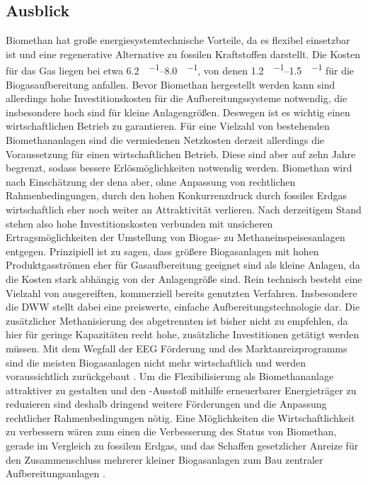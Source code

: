 \subsection{Ausblick}

Biomethan hat große energiesystemtechnische Vorteile, da es flexibel einsetzbar ist und eine regenerative Alternative zu fossilen Kraftstoffen darstellt. Die Kosten für das Gas liegen bei etwa \SIrange{6,2}{8,0}{\ct\per\kwh}, von denen \SIrange{1,2}{1,5}{\ct\per\kwh} für die Biogasaufbereitung anfallen. Bevor Biomethan hergestellt werden kann sind allerdings hohe Investitionskosten für die Aufbereitungssysteme notwendig, die insbesondere hoch sind für kleine Anlagengrößen. Deswegen ist es wichtig einen wirtschaftlichen Betrieb zu garantieren. Für eine Vielzahl von bestehenden Biomethananlagen sind die vermiedenen Netzkosten derzeit allerdings die Voraussetzung für einen wirtschaftlichen Betrieb. Diese sind aber auf zehn Jahre begrenzt, sodass bessere Erlösmöglichkeiten notwendig werden. Biomethan wird nach Einschätzung der dena aber, ohne Anpassung von rechtlichen Rahmenbedingungen, durch den hohen Konkurrenzdruck durch fossiles Erdgas wirtschaftlich eher noch weiter an Attraktivität verlieren.  \parencite{dena2018} \newline
Nach derzeitigem Stand stehen also hohe Investitionskosten verbunden mit unsicheren Ertragsmöglichkeiten der Umstellung von Biogas- zu Methaneinspeisesanlagen entgegen. Prinzipiell ist zu sagen, dass größere Biogasanlagen mit hohen Produktgasströmen eher für Gasaufbereitung geeignet sind als kleine Anlagen, da die Kosten stark abhängig von der Anlagengröße sind. Rein technisch besteht eine Vielzahl von ausgereiften, kommerziell bereits genutzten Verfahren. Insbesondere die \gls{DWW} stellt dabei eine preiswerte, einfache Aufbereitungstechnologie dar. Die zusätzlicher Methanisierung des abgetrennten  ist bisher nicht zu empfehlen, da hier für geringe Kapazitäten recht hohe, zusätzliche Investitionen getätigt werden müssen. \newline
Mit dem Wegfall der \gls{EEG} Förderung und des Marktanreizprogramms sind die meisten Biogasanlagen nicht mehr wirtschaftlich und werden voraussichtlich zurückgebaut \parencite{UmBA19}. Um die Flexibilisierung als Biomethananlage attraktiver zu gestalten und den -Ausstoß mithilfe erneuerbarer Energieträger zu reduzieren sind deshalb dringend weitere Förderungen und die Anpassung rechtlicher Rahmenbedingungen nötig. Eine Möglichkeiten die Wirtschaftlichkeit zu verbessern wären zum einen die Verbesserung des Status von Biomethan, gerade im Vergleich zu fossilem Erdgas, und das Schaffen gesetzlicher Anreize für den Zusammenschluss mehrerer kleiner Biogasanlagen zum Bau zentraler Aufbereitungsanlagen \parencite{UmBA19}. 


